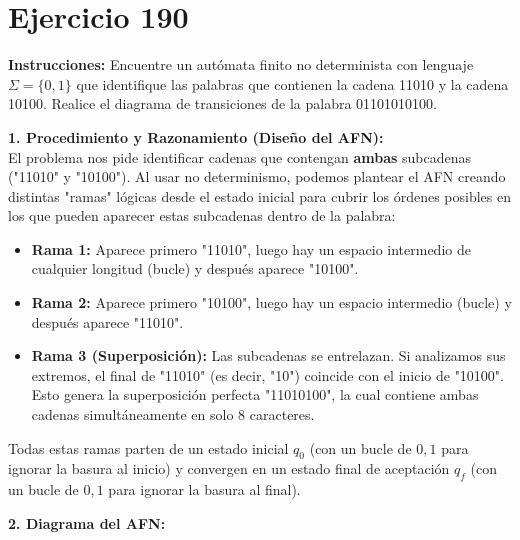 \documentclass[12pt]{article}
\begin{document}
\section*{Ejercicio 190}

\textbf{Instrucciones:} Encuentre un autómata finito no determinista con lenguaje $\Sigma=\{0,1\}$ que identifique las palabras que contienen la cadena 11010 y la cadena 10100. Realice el diagrama de transiciones de la palabra 01101010100. 

\vspace{0.5cm}

\textbf{1. Procedimiento y Razonamiento (Diseño del AFN):} \\
El problema nos pide identificar cadenas que contengan \textbf{ambas} subcadenas ("11010" y "10100"). Al usar no determinismo, podemos plantear el AFN creando distintas "ramas" lógicas desde el estado inicial para cubrir los órdenes posibles en los que pueden aparecer estas subcadenas dentro de la palabra:
\begin{itemize}
    \item \textbf{Rama 1:} Aparece primero "11010", luego hay un espacio intermedio de cualquier longitud (bucle) y después aparece "10100".
    \item \textbf{Rama 2:} Aparece primero "10100", luego hay un espacio intermedio (bucle) y después aparece "11010".
    \item \textbf{Rama 3 (Superposición):} Las subcadenas se entrelazan. Si analizamos sus extremos, el final de "11010" (es decir, "10") coincide con el inicio de "10100". Esto genera la superposición perfecta "11010100", la cual contiene ambas cadenas simultáneamente en solo 8 caracteres.
\end{itemize}
Todas estas ramas parten de un estado inicial $q_0$ (con un bucle de $0,1$ para ignorar la basura al inicio) y convergen en un estado final de aceptación $q_f$ (con un bucle de $0,1$ para ignorar la basura al final).

\vspace{0.5cm}

\textbf{2. Diagrama del AFN:}
\end{document}
